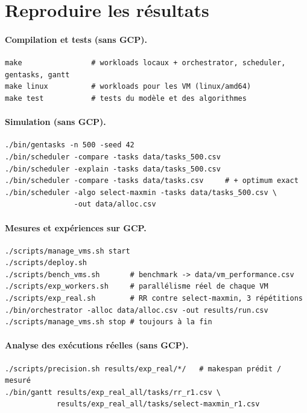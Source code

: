 \section{Reproduire les résultats}
\label{sec:repro}

\lstset{columns=flexible, keepspaces=true}

\paragraph{Compilation et tests (sans GCP).}
\begin{lstlisting}
make                # workloads locaux + orchestrator, scheduler, gentasks, gantt
make linux          # workloads pour les VM (linux/amd64)
make test           # tests du modèle et des algorithmes
\end{lstlisting}

\paragraph{Simulation (sans GCP).}
\begin{lstlisting}
./bin/gentasks -n 500 -seed 42
./bin/scheduler -compare -tasks data/tasks_500.csv
./bin/scheduler -explain -tasks data/tasks_500.csv
./bin/scheduler -compare -tasks data/tasks.csv     # + optimum exact
./bin/scheduler -algo select-maxmin -tasks data/tasks_500.csv \
                -out data/alloc.csv
\end{lstlisting}

\paragraph{Mesures et expériences sur GCP.}
\begin{lstlisting}
./scripts/manage_vms.sh start
./scripts/deploy.sh
./scripts/bench_vms.sh       # benchmark -> data/vm_performance.csv
./scripts/exp_workers.sh     # parallélisme réel de chaque VM
./scripts/exp_real.sh        # RR contre select-maxmin, 3 répétitions
./bin/orchestrator -alloc data/alloc.csv -out results/run.csv
./scripts/manage_vms.sh stop # toujours à la fin
\end{lstlisting}

\paragraph{Analyse des exécutions réelles (sans GCP).}
\begin{lstlisting}
./scripts/precision.sh results/exp_real/*/   # makespan prédit / mesuré
./bin/gantt results/exp_real_all/tasks/rr_r1.csv \
            results/exp_real_all/tasks/select-maxmin_r1.csv
\end{lstlisting}

